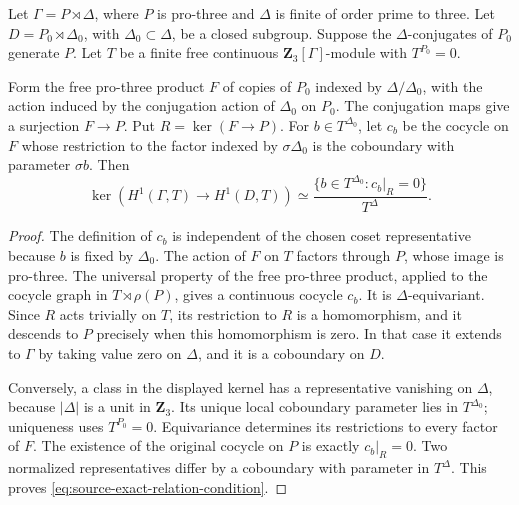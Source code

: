 \begin{proposition}
\label{prop:source-exact-relation-condition}
Let \(\Gamma=P\rtimes\Delta\), where \(P\) is pro-three and
\(\Delta\) is finite of order prime to three. Let
\(D=P_0\rtimes\Delta_0\), with \(\Delta_0\subset\Delta\), be a
closed subgroup. Suppose the \(\Delta\)-conjugates of \(P_0\)
generate \(P\). Let \(T\) be a finite free continuous
\(\mathbf Z_3[\Gamma]\)-module with \(T^{P_0}=0\).

Form the free pro-three product \(F\) of copies of \(P_0\) indexed
by \(\Delta/\Delta_0\), with the action induced by the conjugation
action of \(\Delta_0\) on \(P_0\). The conjugation maps give a
surjection \(F\to P\). Put \(R=\ker(F\to P)\).
For \(b\in T^{\Delta_0}\), let \(c_b\) be the cocycle on \(F\)
whose restriction to the factor indexed by \(\sigma\Delta_0\)
is the coboundary with parameter \(\sigma b\).
Then
\begin{equation}
 \ker\!\left(H^1(\Gamma,T)\longrightarrow H^1(D,T)\right)
 \simeq
 \frac{\{b\in T^{\Delta_0}:c_b|_R=0\}}{T^\Delta}.
 \label{eq:source-exact-relation-condition}
\end{equation}
\end{proposition}
\begin{proof}
The definition of \(c_b\) is independent of the chosen coset
representative because \(b\) is fixed by \(\Delta_0\).
The action of \(F\) on \(T\) factors through \(P\), whose image
is pro-three. The universal property of the free pro-three product,
applied to the cocycle graph in \(T\rtimes\rho(P)\), gives a
continuous cocycle \(c_b\). It is \(\Delta\)-equivariant.
Since \(R\) acts trivially on \(T\), its restriction to \(R\)
is a homomorphism, and it descends to \(P\) precisely when this
homomorphism is zero. In that case it extends to \(\Gamma\)
by taking value zero on \(\Delta\), and it is a coboundary
on \(D\).

Conversely, a class in the displayed kernel has a representative
vanishing on \(\Delta\), because \(|\Delta|\) is a unit in
\(\mathbf Z_3\). Its unique local coboundary parameter lies in
\(T^{\Delta_0}\); uniqueness uses \(T^{P_0}=0\).
Equivariance determines its restrictions to every factor of \(F\).
The existence of the original cocycle on \(P\) is exactly
\(c_b|_R=0\). Two normalized representatives differ by a
coboundary with parameter in \(T^\Delta\). This proves
\eqref{eq:source-exact-relation-condition}.
\end{proof}

